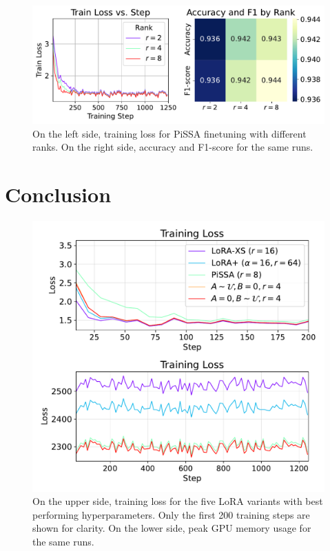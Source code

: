 \documentclass[a4paper,10pt,twocolumn,english]{article}
\begin{document}
\begin{figure}[ht]
    \centering
    \includegraphics[width=1\linewidth]{../plots/pissa_train_loss_vs_step_final_v3.pdf}
    \caption{On the left side, training loss for PiSSA finetuning with different ranks. On the right side, accuracy and F1-score for the same runs.}
    \label{fig:pissa}
\end{figure}

\section{Conclusion}

\begin{figure}[ht]
    \centering
    \includegraphics[width=1\linewidth]{../plots/train_loss_and_gpu_mem_final.pdf}
    \caption{On the upper side, training loss for the five LoRA variants with best performing hyperparameters. Only the first 200 training steps are shown for clarity. On the lower side, peak GPU memory usage for the same runs.}
    \label{fig:pissa}
\end{figure}




\end{document}
